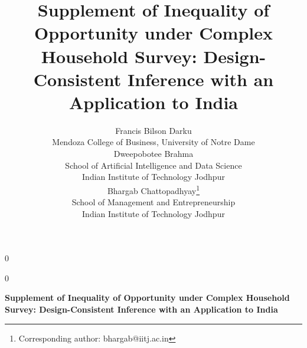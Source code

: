 \documentclass[12pt]{article}
\theoremstyle{plain}
\theoremstyle{definition}
\newcommand{\anon}{0}
\begin{document}
\date{}

\def\spacingset#1{\renewcommand{\baselinestretch}%
{#1}\small\normalsize} \spacingset{1}




\anon
{
  \title{\bf Supplement of Inequality of Opportunity under Complex Household Survey: Design-Consistent Inference with an Application to India}
  \author{Francis Bilson Darku\\
    Mendoza College of Business, University of Notre Dame
    \vspace{0.3cm}\\
    Dweepobotee Brahma \\
   School of Artificial Intelligence and Data Science\\
   Indian Institute of Technology Jodhpur\vspace{0.3cm}\\
   Bhargab Chattopadhyay\thanks{Corresponding author: bhargab@iitj.ac.in} \\
   School of Management and Entrepreneurship\\
   Indian Institute of Technology Jodhpur
   }
  \maketitle

} \fi

\anon
{
  \bigskip
  \bigskip
  \bigskip
  \begin{center}
    {\LARGE\bf Supplement of Inequality of Opportunity under Complex Household Survey: Design-Consistent Inference with an Application to India}
\end{center}
  \medskip
} \fi

\bigskip
\spacingset{1.8} %
\end{document}
